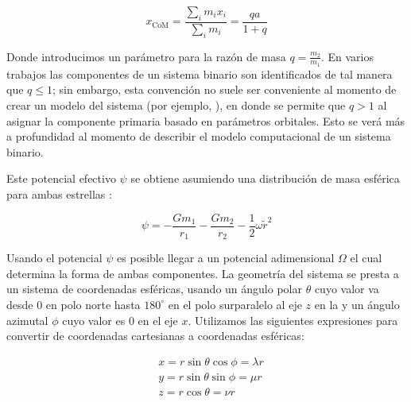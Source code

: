 \begin{eqfloat}[!ht]
	\centering
	\begin{equation}
		x_{\textrm{CoM}} = \frac{\sum_{i}{m_i x_i}}{\sum_{i}{m_i}} = \frac{qa}{1 + q}
	\end{equation}
	\blankcaption
	\label{ecuacionCentroDeMasa}
\end{eqfloat}

Donde introducimos un parámetro para la razón de masa $q = \frac{m_2}{m_1}$. En
varios trabajos las componentes de un sistema binario son identificados de tal
manera que $q \leq 1$; sin embargo, esta convención no suele ser conveniente al
momento de crear un modelo del sistema (por ejemplo,
\autocite{ding_fast_derivation_cbs_params_2022}), en donde se permite que $q > 1$
al asignar la componente primaria basado en parámetros orbitales. Esto se verá
más a profundidad al momento de describir el modelo computacional de un sistema
binario.

Este potencial efectivo $\psi$ se obtiene asumiendo una distribución de masa
esférica para ambas estrellas :

\begin{eqfloat}[!ht]
	\centering
	\begin{equation}
		\psi = -\frac{G m_1}{r_1} - \frac{G m_2}{r_2} - \frac{1}{2} \omega \tilde{r}^2
	\end{equation}
	\blankcaption
	\label{ecuacionPotencialEfectivo}
\end{eqfloat}

Usando el potencial $\psi$ es posible llegar a un potencial adimensional
$\Omega$ el cual determina la forma de ambas componentes. La geometría del
sistema se presta a un sistema de coordenadas esféricas, usando un ángulo polar
$\theta$ cuyo valor va desde $0$ en polo norte hasta $180^{\circ}$ en el polo
sur\textemdash paralelo al eje $z$ en la
\textemdash y un ángulo azimutal $\phi$ cuyo valor
es $0$ en el eje $x$. Utilizamos las siguientes expresiones para convertir de
coordenadas cartesianas a coordenadas esféricas:

\begin{eqfloat}[!ht]
	\centering
	\begin{equation}
		\begin{split}
			& x = r \sin{\theta} \cos{\phi} = \lambda r \\
			& y = r \sin{\theta} \sin{\phi} = \mu r \\
			& z = r \cos{\theta} = \nu r
		\end{split}
	\end{equation}
	\blankcaption
	\label{ecuacionesCoordsEsfericasConversion}
\end{eqfloat}

